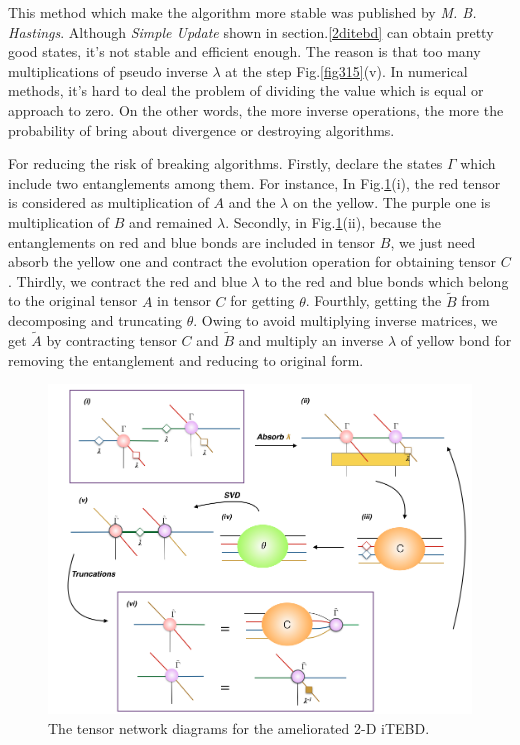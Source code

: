 This method which make the algorithm more stable was published by \textit{M. B. Hastings}. Although \textit{Simple Update} shown in section.\ref{2ditebd} can obtain pretty good states, it's not stable and efficient enough. The reason is that too many multiplications of pseudo inverse $\lambda$ at the step Fig.\ref{fig315}(v). In numerical methods, it's hard to deal the problem of dividing the value which is equal or approach to zero. On the other words, the more inverse operations, the more the probability of bring about divergence or destroying algorithms.

For reducing the risk of breaking algorithms. Firstly, declare the states $\Gamma$ which include two entanglements among them. For instance, In Fig.\ref{fig317}(i), the red tensor is considered as multiplication of $A$ and the $\lambda$ on the yellow. The purple one is multiplication of $B$ and remained $\lambda$. Secondly, in Fig.\ref{fig317}(ii), because the entanglements on red and blue bonds are included in tensor $B$, we just need absorb the yellow one and contract the evolution operation for obtaining tensor $C$. Thirdly, we contract the red and blue $\lambda$ to the red and blue bonds which belong to the original tensor $A$ in tensor $C$ for getting $\theta$. Fourthly, getting the $\tilde{B}$ from decomposing and truncating $\theta$. Owing to avoid multiplying inverse matrices, we get $\tilde{A}$ by contracting tensor $C$ and $\tilde{B}$ and multiply an inverse $\lambda$ of yellow bond for removing the entanglement and reducing to original form.

	\begin{figure}[ht]
	\centering
	\includegraphics[width=1.00\textwidth]{figures/fig317.png}
	\caption[The tensor network diagrams for the 2-D iTEBD with QR decomposition]{The tensor network diagrams for the ameliorated 2-D iTEBD.}
	\label{fig317}
	\end{figure}

